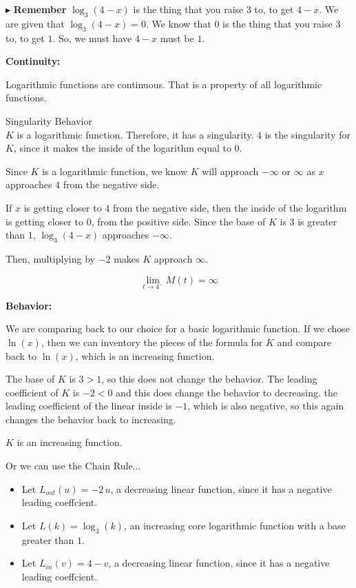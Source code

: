 \documentclass{ximera}
\begin{document}
\begin{formuala}
\begin{example}
$\blacktriangleright$ \textbf{Remember} $\log_3(4 - x)$ is the thing that you raise $3$ to, to get $4 - x$. We are given that $\log_3(4 - x) = 0$.  We know that $0$ is the thing that you raise $3$ to, to get $1$. So, we must have $4 - x$ must be $1$.




\textbf{Continuity:}  

Logarithmic functions are continuous.  That is a property of all logarithmic functions. 



Singularity Behavior \\
$K$ is a logarithmic function. Therefore, it has a singularity.  $4$ is the singularity for $K$, since it makes the inside of the logarithm equal to $0$.

Since $K$ is a logarithmic function, we know $K$ will approach $-\infty$ or $\infty$ as $x$ approaches $4$ from the negative side. 

If $x$ is getting closer to $4$ from the negative side, then the inside of the logarithm is getting closer to $0$, from the positive side.  Since the base of $K$ is $3$ is greater than $1$, $\log_3(4-x)$ approaches $-\infty$.

Then, multiplying by $-2$ makes $K$ approach $\infty$.


\[
\lim\limits_{t \to 4^-} M(t) = \infty
\]






\textbf{Behavior:} 

We are comparing back to our choice for a basic logarithmic function.  If we chose $\ln(x)$, then we can inventory the pieces of the formula for $K$ and compare back to $\ln(x)$, which is an increasing function.  



The base of $K$ is $3 > 1$, so this does not change the behavior.
The leading coefficient of $K$ is $-2 < 0$ and this does change the behavior to decreasing. 
the leading coefficient of the linear inside is $-1$, which is also negative, so this again changes the behavior back to increasing.

$K$ is an increasing function. 





Or we can use the Chain Rule...


\begin{itemize}
\item Let $L_{out}(u) = -2 \, u$, a decreasing linear function, since it has a negative leading coeffcient.
\item Let $L(k) = \log_3(k)$, an increasing core logarithmic function with a base greater than $1$.
\item Let $L_{in}(v) = 4 - v$, a decreasing linear function, since it has a negative leading coeffcient.
\end{itemize}



\end{example}
\end{formuala}
\end{document}
